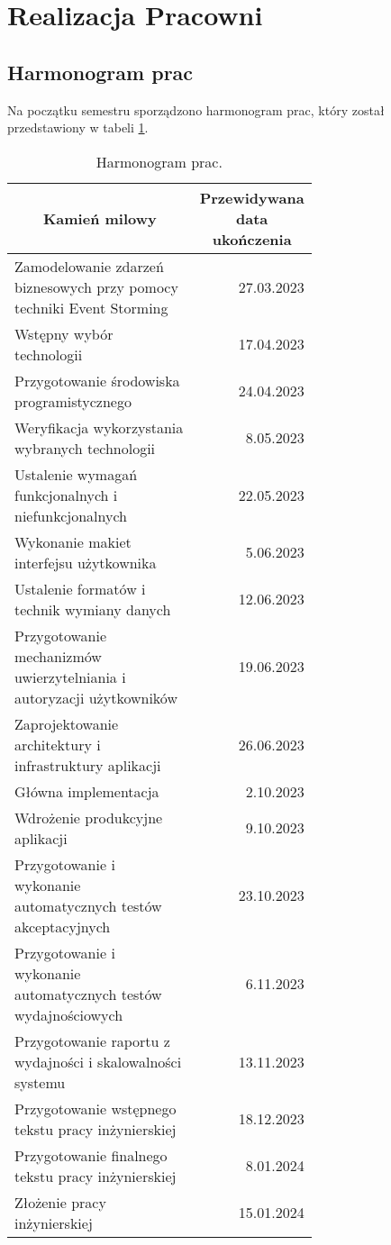 \clearpage %
\section{Realizacja Pracowni}

\subsection{Harmonogram prac}

Na początku semestru sporządzono harmonogram prac, który został przedstawiony w tabeli \ref{table:harmonogram}.

\begin{longtable}{| m{0.67\linewidth} | r |}
    \caption{Harmonogram prac.}
    \label{table:harmonogram} \\

    \hline
    \multicolumn{1}{|c|}{Kamień milowy} & \multicolumn{1}{c|}{Przewidywana data ukończenia} \\ \hline\hline \endfirsthead \endfoot
    \hline \endlastfoot

    Zamodelowanie zdarzeń biznesowych przy pomocy techniki Event Storming & 27.03.2023 \\ \hline
    Wstępny wybór technologii & 17.04.2023 \\ \hline
    Przygotowanie środowiska programistycznego & 24.04.2023 \\ \hline
    Weryfikacja wykorzystania wybranych technologii & 8.05.2023 \\ \hline
    Ustalenie wymagań funkcjonalnych i niefunkcjonalnych & 22.05.2023 \\ \hline
    Wykonanie makiet interfejsu użytkownika & 5.06.2023 \\ \hline
    Ustalenie formatów i technik wymiany danych & 12.06.2023 \\ \hline
    Przygotowanie mechanizmów uwierzytelniania i autoryzacji użytkowników & 19.06.2023 \\ \hline
    Zaprojektowanie architektury i infrastruktury aplikacji & 26.06.2023 \\ \hline
    Główna implementacja & 2.10.2023 \\ \hline
    Wdrożenie produkcyjne aplikacji & 9.10.2023 \\ \hline
    Przygotowanie i wykonanie automatycznych testów akceptacyjnych & 23.10.2023 \\ \hline
    Przygotowanie i wykonanie automatycznych testów wydajnościowych & 6.11.2023\\ \hline
    Przygotowanie raportu z wydajności i skalowalności systemu & 13.11.2023 \\ \hline
    Przygotowanie wstępnego tekstu pracy inżynierskiej & 18.12.2023 \\ \hline
    Przygotowanie finalnego tekstu pracy inżynierskiej & 8.01.2024 \\ \hline
    Złożenie pracy inżynierskiej & 15.01.2024 \\ \hline
\end{longtable}

